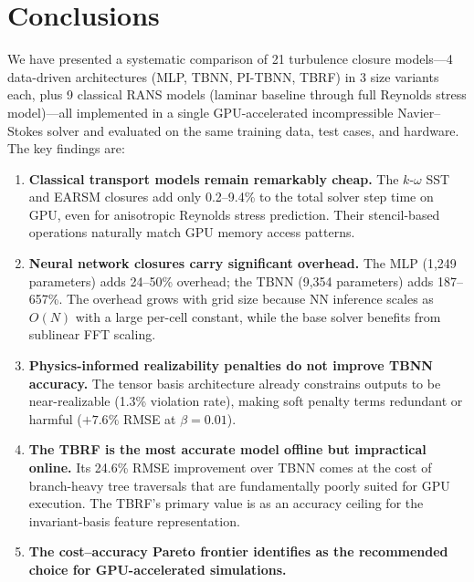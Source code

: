\section{Conclusions}
\label{sec:conclusions}


We have presented a systematic comparison of 21 turbulence closure models---4 data-driven architectures (MLP, TBNN, PI-TBNN, TBRF) in 3 size variants each, plus 9 classical RANS models (laminar baseline through full Reynolds stress model)---all implemented in a single GPU-accelerated incompressible Navier--Stokes solver and evaluated on the same training data, test cases, and hardware.
The key findings are:

\begin{enumerate}
    \item \textbf{Classical transport models remain remarkably cheap.}
    The $k$-$\omega$ SST and EARSM closures add only 0.2--9.4\% to the total solver step time on GPU, even for anisotropic Reynolds stress prediction.
    Their stencil-based operations naturally match GPU memory access patterns.

    \item \textbf{Neural network closures carry significant overhead.}
    The MLP (1{,}249 parameters) adds 24--50\% overhead; the TBNN (9{,}354 parameters) adds 187--657\%.
    The overhead grows with grid size because NN inference scales as $O(N)$ with a large per-cell constant, while the base solver benefits from sublinear FFT scaling.

    \item \textbf{Physics-informed realizability penalties do not improve TBNN accuracy.}
    The tensor basis architecture already constrains outputs to be near-realizable (1.3\% violation rate), making soft penalty terms redundant or harmful ($+7.6\%$ RMSE at $\beta = 0.01$).

    \item \textbf{The TBRF is the most accurate model offline but impractical online.}
    Its 24.6\% RMSE improvement over TBNN comes at the cost of branch-heavy tree traversals that are fundamentally poorly suited for GPU execution.
    The TBRF's primary value is as an accuracy ceiling for the invariant-basis feature representation.

    \item \textbf{The cost--accuracy Pareto frontier identifies  as the recommended choice for GPU-accelerated simulations.}
\end{enumerate}

